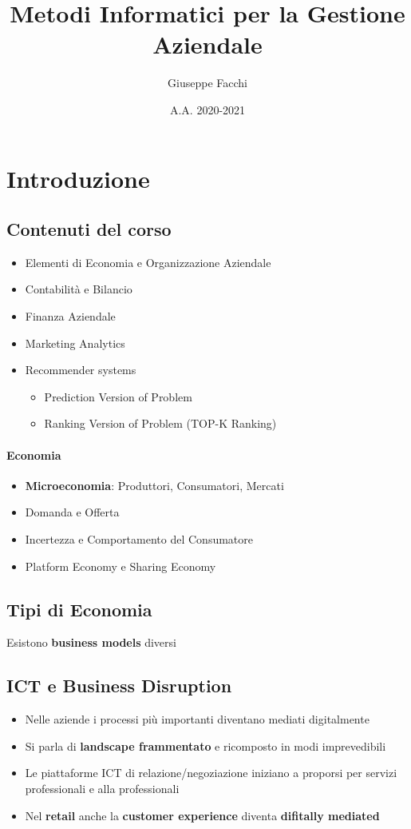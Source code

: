 \documentclass[12pt]{article}
\title{Metodi Informatici per la Gestione Aziendale}
\author{Giuseppe Facchi}
\date{A.A. 2020-2021}
\begin{document}
\maketitle
\newpage
\tableofcontents
\newpage

\section{Introduzione}
\subsection{Contenuti del corso}
\begin{itemize}
    \item Elementi di Economia e Organizzazione Aziendale
    \item Contabilità e Bilancio
    \item Finanza Aziendale
    \item Marketing Analytics
    \item Recommender systems
          \begin{itemize}
              \item Prediction Version of Problem
              \item Ranking Version of Problem (TOP-K Ranking)
          \end{itemize}
\end{itemize}

\paragraph{Economia}
\begin{itemize}
    \item \textbf{Microeconomia}: Produttori, Consumatori, Mercati
    \item Domanda e Offerta
    \item Incertezza e Comportamento del Consumatore
    \item Platform Economy e Sharing Economy
\end{itemize}

\subsection{Tipi di Economia}
Esistono \textbf{business models} diversi

\subsection{ICT e Business Disruption}
\begin{itemize}
    \item Nelle aziende i processi più importanti diventano mediati digitalmente
    \item Si parla di \textbf{landscape frammentato} e ricomposto in modi imprevedibili
    \item Le piattaforme ICT di relazione/negoziazione iniziano a proporsi per servizi professionali e alla professionali
    \item Nel \textbf{retail} anche la \textbf{customer experience} diventa \textbf{difitally mediated}
\end{itemize}
\newpage
\end{document}
